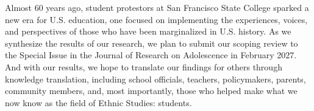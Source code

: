     {
    Almost 60 years ago, student protestors at San Francisco State College sparked a new era for U.S. education, one focused on implementing the experiences, voices, and perspectives of those who have been marginalized in U.S. history. As we synthesize the results of our research, we plan to submit our scoping review to the Special Issue in the Journal of Research on Adolescence in February 2027. And with our results, we hope to translate our findings for others through knowledge translation, including school officials, teachers, policymakers, parents, community members, and, most importantly, those who helped make what we now know as the field of Ethnic Studies: students.
    }

    \newpage
    